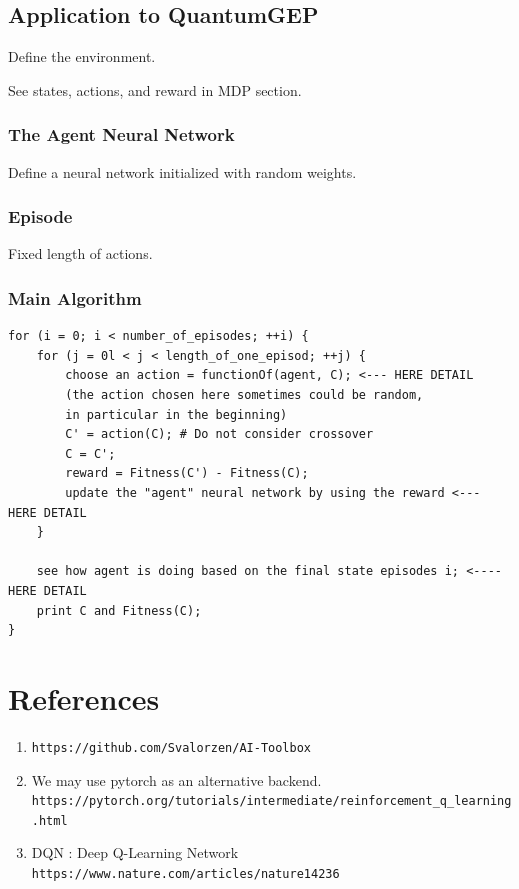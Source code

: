 \documentclass{article}
\begin{document}
\subsection{Application to QuantumGEP}

Define the environment.

See states, actions, and reward in MDP section.


\subsubsection{The Agent Neural Network}

Define a neural network initialized with random weights.

\subsubsection{Episode}
Fixed length of actions.

\subsubsection{Main Algorithm}

\begin{small}
\begin{verbatim}
for (i = 0; i < number_of_episodes; ++i) {
	for (j = 0l < j < length_of_one_episod; ++j) {
		choose an action = functionOf(agent, C); <--- HERE DETAIL
		(the action chosen here sometimes could be random,
		in particular in the beginning)
		C' = action(C); # Do not consider crossover
		C = C';
		reward = Fitness(C') - Fitness(C);
		update the "agent" neural network by using the reward <--- HERE DETAIL
	}
	
	see how agent is doing based on the final state episodes i; <---- HERE DETAIL
	print C and Fitness(C);
}
\end{verbatim}\end{small}

\section{References}

\begin{enumerate}

\item \nolinkurl{https://github.com/Svalorzen/AI-Toolbox}
\item We may use pytorch as an alternative backend. \nolinkurl{https://pytorch.org/tutorials/intermediate/reinforcement_q_learning.html}

\item DQN : Deep Q-Learning Network \nolinkurl{https://www.nature.com/articles/nature14236}
\end{enumerate}
\end{document}
